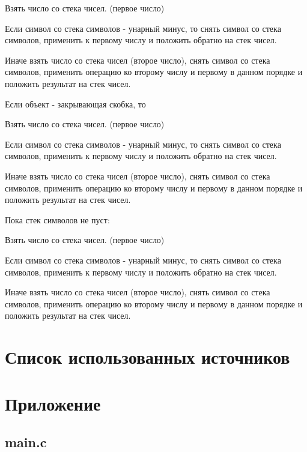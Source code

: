 \documentclass[a4paper,14pt]{extarticle}
\begin{document}
{{{{					{\setlength{\leftskip}{10em}
					
					Взять число со стека чисел. (первое число)
					
					Если символ со стека символов - унарный минус, то снять символ со стека символов, применить к первому числу и положить обратно на стек чисел.
					
					Иначе взять число со стека чисел (второе число), снять символ со стека символов, применить операцию ко второму числу и первому в данном порядке и положить результат на стек чисел.
					}
				}
			}
		}
	
	Если объект - закрывающая скобка, то
	
	{\setlength{\leftskip}{4em}
		Взять число со стека чисел. (первое число)
		
		Если символ со стека символов - унарный минус, то снять символ со стека символов, применить к первому числу и положить обратно на стек чисел.
		
		Иначе взять число со стека чисел (второе число), снять символ со стека символов, применить операцию ко второму числу и первому в данном порядке и положить результат на стек чисел.
	}
}

Пока стек символов не пуст:

{\setlength{\leftskip}{2em}
	Взять число со стека чисел. (первое число)
	
	Если символ со стека символов - унарный минус, то снять символ со стека символов, применить к первому числу и положить обратно на стек чисел.
	
	Иначе взять число со стека чисел (второе число), снять символ со стека символов, применить операцию ко второму числу и первому в данном порядке и положить результат на стек чисел.

}

\section{Список использованных источников}

\section{Приложение}
\subsection{main.c}
\end{document}
